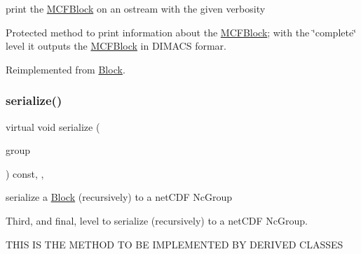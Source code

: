 print the \mbox{\hyperlink{class_s_m_spp__di__unipi__it_1_1_m_c_f_block}{M\+C\+F\+Block}} on an ostream with the given verbosity 

Protected method to print information about the \mbox{\hyperlink{class_s_m_spp__di__unipi__it_1_1_m_c_f_block}{M\+C\+F\+Block}}; with the \char`\"{}complete\char`\"{} level it outputs the \mbox{\hyperlink{class_s_m_spp__di__unipi__it_1_1_m_c_f_block}{M\+C\+F\+Block}} in D\+I\+M\+A\+CS formar. 

Reimplemented from \mbox{\hyperlink{class_s_m_spp__di__unipi__it_1_1_block_a2e7b9c9148a98c5c342e8c25cac95926}{Block}}.

\mbox{\label{class_s_m_spp__di__unipi__it_1_1_m_c_f_block_a1b39d46ae5259d58a1a1ed05af6c344d}} 
\subsubsection{\texorpdfstring{serialize()}{serialize()}}
{\footnotesize\ttfamily virtual void serialize (\begin{DoxyParamCaption}\item[{net\+C\+D\+F\+::\+Nc\+Group \&\&}]{group }\end{DoxyParamCaption}) const\hspace{0.3cm}{\ttfamily [final]}, {\ttfamily [override]}, {\ttfamily [virtual]}}



serialize a \mbox{\hyperlink{class_s_m_spp__di__unipi__it_1_1_block}{Block}} (recursively) to a net\+C\+DF Nc\+Group 

Third, and final, level to serialize (recursively) to a net\+C\+DF Nc\+Group. \begin{DoxyVerb}THIS IS THE METHOD TO BE IMPLEMENTED BY DERIVED CLASSES
\end{DoxyVerb}


